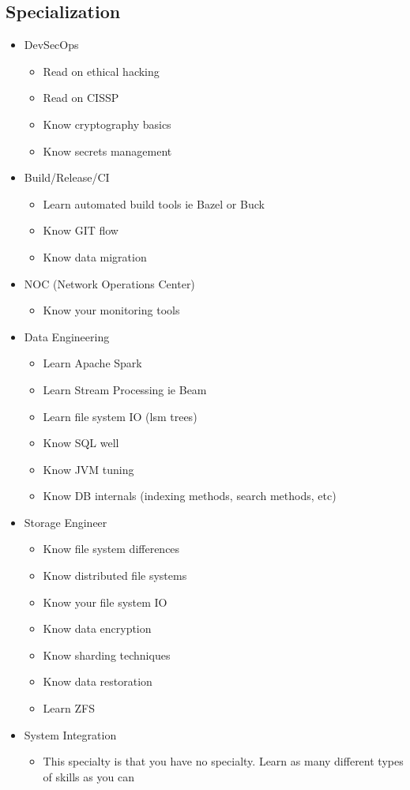 \documentclass[12pt]{article}
\begin{document}
\subsection{Specialization}
\begin{itemize}
\item DevSecOps
  \begin{itemize}
  \item Read on ethical hacking
  \item Read on CISSP
  \item Know cryptography basics
  \item Know secrets management
  \end{itemize}
\item Build/Release/CI
  \begin{itemize}
  \item Learn automated build tools ie Bazel or Buck
  \item Know GIT flow
  \item Know data migration
  \end{itemize}
\item NOC (Network Operations Center)
  \begin{itemize}
  \item Know your monitoring tools
  \end{itemize}
\item Data Engineering\
  \begin{itemize}
  \item Learn Apache Spark
  \item Learn Stream Processing ie Beam
  \item Learn file system IO (lsm trees)
  \item Know SQL well
  \item Know JVM tuning
  \item Know DB internals (indexing methods, search methods, etc)
  \end{itemize}
\item Storage Engineer
  \begin{itemize}
  \item Know file system differences
  \item Know distributed file systems
  \item Know your file system IO
  \item Know data encryption
  \item Know sharding techniques
  \item Know data restoration
  \item Learn ZFS
  \end{itemize}
\item System Integration
  \begin{itemize}
  \item This specialty is that you have no specialty. Learn as many
    different types of skills as you can
  \end{itemize}
\end{itemize}
\end{document}
